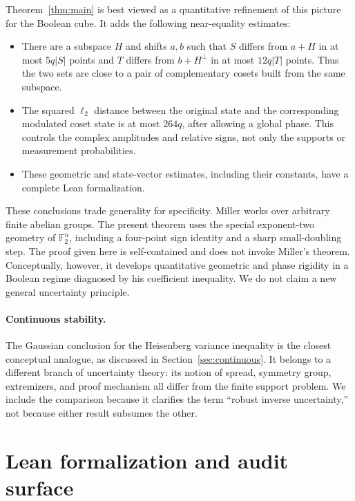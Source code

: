 \documentclass[11pt]{article}
\theoremstyle{remark}
\newcommand{\F}{\mathbb F}
\newcommand{\1}{\mathbf 1}
\begin{document}
Theorem~\ref{thm:main} is best viewed as a quantitative refinement of this
picture for the Boolean cube. It adds the following near-equality estimates:
\begin{itemize}
  \item There are a subspace $H$ and shifts $a,b$ such that $S$ differs from
  $a+H$ in at most $5q|S|$ points and $T$ differs from $b+H^\perp$ in at
  most $12q|T|$ points. Thus the two sets are close to a pair of
  complementary cosets built from the same subspace.
  \item The squared $\ell_2$ distance between the original state and the
  corresponding modulated coset state is at most $264q$, after allowing a
  global phase. This controls the complex amplitudes and relative signs, not
  only the supports or measurement probabilities.
  \item These geometric and state-vector estimates, including their
  constants, have a complete Lean formalization.
\end{itemize}
These conclusions trade generality for specificity. Miller works over
arbitrary finite abelian groups. The present theorem uses the special
exponent-two geometry of $\F_2^n$, including a four-point sign identity and
a sharp small-doubling step.
The proof given here is self-contained and does not invoke Miller's theorem.
Conceptually, however, it develops quantitative geometric and phase rigidity in
a Boolean regime diagnosed by his coefficient inequality. We do not claim a
new general uncertainty principle.

\paragraph{Continuous stability.}
The Gaussian conclusion for the Heisenberg variance inequality is the
closest conceptual analogue, as discussed in
Section~\ref{sec:continuous}. It belongs to a different branch of
uncertainty theory: its notion of spread, symmetry group, extremizers, and
proof mechanism all differ from the finite support problem. We include the
comparison because it clarifies the term ``robust inverse uncertainty,'' not
because either result subsumes the other.

\section{Lean formalization and audit surface}\label{sec:lean}
\end{document}
